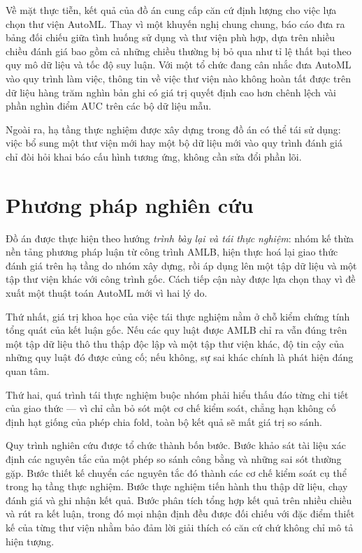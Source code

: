 Về mặt thực tiễn, kết quả của đồ án cung cấp căn cứ định lượng cho việc lựa chọn
thư viện AutoML. Thay vì một khuyến nghị chung chung, báo cáo đưa ra bảng đối
chiếu giữa tình huống sử dụng và thư viện phù hợp, dựa trên nhiều chiều đánh giá
bao gồm cả những chiều thường bị bỏ qua như tỉ lệ thất bại theo quy mô dữ liệu và
tốc độ suy luận. Với một tổ chức đang cân nhắc đưa AutoML vào quy trình làm việc,
thông tin về việc thư viện nào không hoàn tất được trên dữ liệu hàng trăm nghìn
bản ghi có giá trị quyết định cao hơn chênh lệch vài phần nghìn điểm AUC trên các
bộ dữ liệu mẫu.

Ngoài ra, hạ tầng thực nghiệm được xây dựng trong đồ án có thể tái sử dụng: việc
bổ sung một thư viện mới hay một bộ dữ liệu mới vào quy trình đánh giá chỉ đòi hỏi
khai báo cấu hình tương ứng, không cần sửa đổi phần lõi.

\section{Phương pháp nghiên cứu}
\label{sec:phuongphapnc}
Đồ án được thực hiện theo hướng \emph{trình bày lại và tái thực nghiệm}: nhóm kế
thừa nền tảng phương pháp luận từ công trình AMLB, hiện thực hoá lại giao thức
đánh giá trên hạ tầng do nhóm xây dựng, rồi áp dụng lên một tập dữ liệu và một tập
thư viện khác với công trình gốc. Cách tiếp cận này được lựa chọn thay vì đề xuất
một thuật toán AutoML mới vì hai lý do.

Thứ nhất, giá trị khoa học của việc tái thực nghiệm nằm ở chỗ kiểm chứng tính tổng
quát của kết luận gốc. Nếu các quy luật được AMLB chỉ ra vẫn đúng trên một tập dữ
liệu thô thu thập độc lập và một tập thư viện khác, độ tin cậy của những quy luật
đó được củng cố; nếu không, sự sai khác chính là phát hiện đáng quan tâm.

Thứ hai, quá trình tái thực nghiệm buộc nhóm phải hiểu thấu đáo từng chi tiết của
giao thức --- vì chỉ cần bỏ sót một cơ chế kiểm soát, chẳng hạn không cố định hạt
giống của phép chia fold, toàn bộ kết quả sẽ mất giá trị so sánh.

Quy trình nghiên cứu được tổ chức thành bốn bước. Bước khảo sát tài liệu xác định
các nguyên tắc của một phép so sánh công bằng và những sai sót thường gặp. Bước
thiết kế chuyển các nguyên tắc đó thành các cơ chế kiểm soát cụ thể trong hạ tầng
thực nghiệm. Bước thực nghiệm tiến hành thu thập dữ liệu, chạy đánh giá và ghi
nhận kết quả. Bước phân tích tổng hợp kết quả trên nhiều chiều và rút ra kết luận,
trong đó mọi nhận định đều được đối chiếu với đặc điểm thiết kế của từng thư viện
nhằm bảo đảm lời giải thích có căn cứ chứ không chỉ mô tả hiện tượng.

